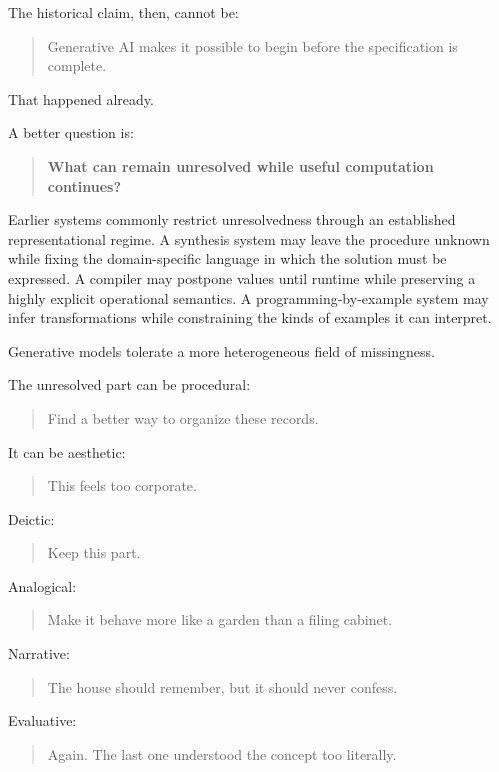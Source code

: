 \documentclass[
]{article}
\begin{document}
The historical claim, then, cannot be:

\begin{quote}
Generative AI makes it possible to begin before the specification is
complete.
\end{quote}

That happened already.

A better question is:

\begin{quote}
\textbf{What can remain unresolved while useful computation continues?}
\end{quote}

Earlier systems commonly restrict unresolvedness through an established
representational regime. A synthesis system may leave the procedure
unknown while fixing the domain-specific language in which the solution
must be expressed. A compiler may postpone values until runtime while
preserving a highly explicit operational semantics. A
programming-by-example system may infer transformations while
constraining the kinds of examples it can interpret.

Generative models tolerate a more heterogeneous field of missingness.

The unresolved part can be procedural:

\begin{quote}
Find a better way to organize these records.
\end{quote}

It can be aesthetic:

\begin{quote}
This feels too corporate.
\end{quote}

Deictic:

\begin{quote}
Keep this part.
\end{quote}

Analogical:

\begin{quote}
Make it behave more like a garden than a filing cabinet.
\end{quote}

Narrative:

\begin{quote}
The house should remember, but it should never confess.
\end{quote}

Evaluative:

\begin{quote}
Again. The last one understood the concept too literally.
\end{quote}
\end{document}

